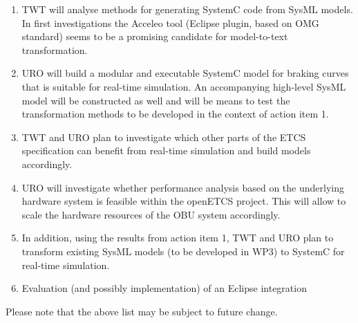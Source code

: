 \documentclass{template/openetcs_report}
\begin{document}
\begin{enumerate}
  \item TWT will analyse methods for generating SystemC code from
  SysML models. In first investigations the Acceleo tool (Eclipse
  plugin, based on OMG standard) seems to be a promising candidate for
  model-to-text transformation.
  \item URO will build a modular and executable SystemC model for
  braking curves that is suitable for real-time simulation. An
  accompanying high-level SysML model will be constructed as well and
  will be means to test the transformation methods to be developed in
  the context of action item 1.
  \item TWT and URO plan to investigate which other parts of the ETCS
  specification can benefit from real-time simulation and build models
  accordingly.
  \item URO will investigate whether performance analysis based on the
  underlying hardware system is feasible within the openETCS
  project. This will allow to scale the hardware resources of the OBU
  system accordingly.
  \item In addition, using the results from action item 1, TWT and URO
    plan to transform existing SysML models (to be developed in WP3)
    to SystemC for real-time simulation.
  \item Evaluation (and possibly implementation) of an Eclipse
  integration
\end{enumerate}

Please note that the above list may be subject to future change.
\end{document}
